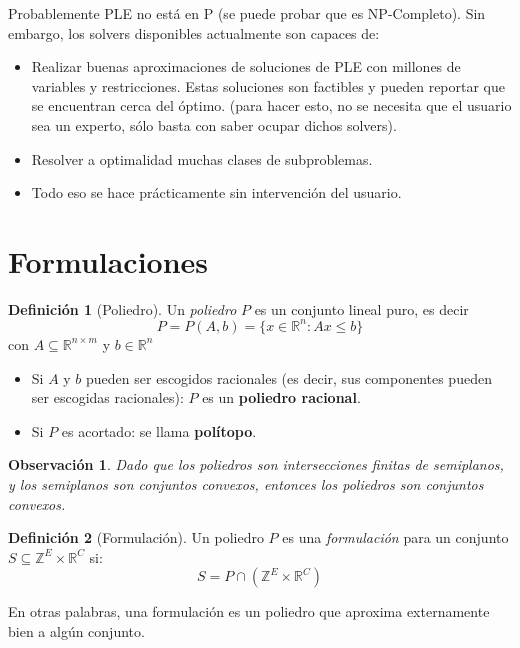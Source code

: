 \documentclass[10pt]{article}
\newcommand{\RR}{\mathbb R}
\newcommand{\ZZ}{\mathbb Z}
\theoremstyle{plain}
\newtheorem{obs}{Observaci\'on}
\theoremstyle{definition}
\newtheorem{defi}{Definición}
\begin{document}
Probablemente PLE no está en P (se puede probar que es NP-Completo). Sin embargo, los solvers disponibles actualmente son capaces de:
\begin{itemize}
    \item Realizar buenas aproximaciones de soluciones de PLE con millones de variables y restricciones. Estas soluciones son factibles y pueden reportar que se encuentran cerca del óptimo. (para hacer esto, no se necesita que el usuario sea un experto, sólo basta con saber ocupar dichos solvers).
    \item Resolver a optimalidad muchas clases de subproblemas.
    \item Todo eso se hace prácticamente sin intervención del usuario.
\end{itemize}

\section{Formulaciones}
\begin{defi}[Poliedro] Un \emph{poliedro} $P$ es un conjunto lineal puro, es decir
$$P=P(A,b)=\{x\in \RR^n:Ax\leq b\}$$
con $A\subseteq \RR^{n\times m}$ y $b\in \RR^n$
\end{defi}
\begin{itemize}
    \item Si $A$ y $b$ pueden ser escogidos racionales (es decir, sus componentes pueden ser escogidas racionales): $P$ es un \textbf{poliedro racional}.
    \item Si $P$ es acortado: se llama \textbf{polítopo}.
\end{itemize}
\begin{obs}
Dado que los poliedros son intersecciones finitas de semiplanos, y los semiplanos son conjuntos convexos, entonces los poliedros son \textit{conjuntos convexos}.
\end{obs}
\begin{defi}[Formulación] Un poliedro $P$ es una \emph{formulación} para un conjunto $S\subseteq\ZZ^E \times \RR^ C$ si:
$$S=P\cap (\ZZ^E \times \RR^C)$$
\end{defi}
En otras palabras, una formulación es un poliedro que aproxima externamente bien a algún conjunto.
\end{document}

